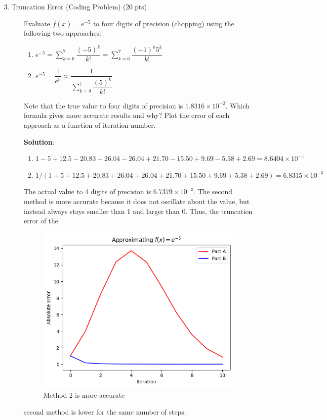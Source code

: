 \documentclass[12pt]{article}
\newcommand{\ds}{\displaystyle}
\begin{document}
\begin{description}
\item[3. Truncation Error \color{red} (Coding Problem) \color{black} (20 pts)] Evaluate $f (x) = e^{-5}$ to four digits of precision (chopping) using the following two approaches:
    \begin{enumerate}[label=\textbf{(\alph*)}]
    \item $e^{-5} = \ds\sum^7_{k = 0} \dfrac{(-5)^k}{k!} = \ds\sum^7_{k = 0} \dfrac{(-1)^k 5^k}{k!}$
    \item $e^{-5} = \dfrac{1}{e^5} \approx \dfrac{1}{\ds\sum^7_{k = 0} \dfrac{(5)^k}{k!}}$
    \end{enumerate}
    Note that the true value to four digits of precision is $1.8316 \times 10^{-2}$. Which formula gives more accurate results and why? Plot the error of each approach as a function of iteration number.

    \color{red}
    \ifsolution
    {\bf Solution}:
    \begin{enumerate}[label=\textbf{(\alph*)}]
    \item $1-5+12.5-20.83+26.04-26.04+21.70-15.50+9.69-5.38+2.69 = 8.6404 \times 10^{-1}$ 
    \item $1/(1+5+12.5+20.83+26.04+26.04+21.70+15.50+9.69+5.38+2.69)  = 6.8315 \times 10^{-3}$
    \end{enumerate}
    The actual value to 4 digits of precision is $6.7379 \times 10^{-3}$. The second method is more accurate because it does not oscillate about the value, but instead always stays smaller than 1 and larger than 0. Thus, the truncation error of the     \begin{figure}[h!]
	\centering\includegraphics[width=4.5in]{HW1Fig2.png}
	\caption{Method 2 is more accurate}
	\label{fig:truncationError}
\end{figure}second method is lower for the same number of steps.
    

\end{description}
\end{document}
